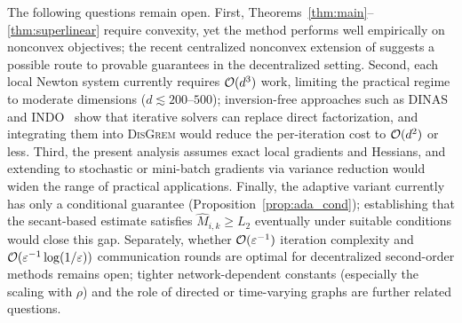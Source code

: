 \documentclass[review,onefignum,onetabnum]{siamart171218}
\begin{document}
	The following questions remain open.
	First, Theorems~\ref{thm:main}--\ref{thm:superlinear} require convexity,
	yet the method performs well empirically on nonconvex objectives;
	the recent centralized nonconvex extension of
	\citet{ding2025nonconvex} suggests a possible route to provable
	guarantees in the decentralized setting.
	Second, each local Newton system currently requires $\mathcal{O}(d^3)$ work,
	limiting the practical regime to moderate dimensions
	($d\lesssim 200$--$500$);
	inversion-free approaches such as DINAS~\citep{crane2025dinas}
	and INDO~\citep{yuan2023indo} show that iterative
	solvers can replace direct factorization, and
	integrating them into \textsc{DisGrem} would reduce the
	per-iteration cost to $\mathcal{O}(d^2)$ or less.
	Third, the present analysis assumes exact local gradients and Hessians,
	and extending to stochastic or mini-batch gradients via
	variance reduction would widen the range of practical
	applications.
	Finally, the adaptive variant currently has only a conditional guarantee
	(Proposition~\ref{prop:ada_cond});
	establishing that the secant-based estimate satisfies
	$\hat M_{i,k}\ge L_2$ eventually under suitable conditions
	would close this gap.
	Separately, whether $\mathcal{O}(\varepsilon^{-1})$ iteration complexity
	and $\mathcal{O}(\varepsilon^{-1}\log(1/\varepsilon))$ communication
	rounds are optimal for decentralized second-order methods remains
	open; tighter network-dependent constants (especially the
	scaling with $\rho$) and the role of directed or time-varying
	graphs are further related questions.
	
\end{document}

